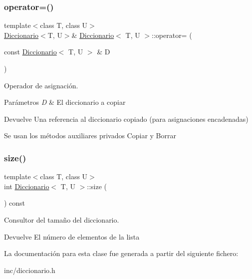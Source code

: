 \subsubsection{\texorpdfstring{operator=()}{operator=()}}
{\footnotesize\ttfamily template$<$class T, class U$>$ \\
\hyperlink{classDiccionario}{Diccionario}$<$T, U$>$\& \hyperlink{classDiccionario}{Diccionario}$<$ T, U $>$\+::operator= (\begin{DoxyParamCaption}\item[{const \hyperlink{classDiccionario}{Diccionario}$<$ T, U $>$ \&}]{D }\end{DoxyParamCaption})\hspace{0.3cm}{\ttfamily [inline]}}



Operador de asignación. 


\begin{DoxyParams}{Parámetros}
{\em D} & El diccionario a copiar \\
\hline
\end{DoxyParams}
\begin{DoxyReturn}{Devuelve}
Una referencia al diccionario copiado (para asignaciones encadenadas)
\end{DoxyReturn}
Se usan los métodos auxiliares privados Copiar y Borrar \mbox{\label{classDiccionario_aa576b001759429fd58210ca57257d6f8}} 
\subsubsection{\texorpdfstring{size()}{size()}}
{\footnotesize\ttfamily template$<$class T, class U$>$ \\
int \hyperlink{classDiccionario}{Diccionario}$<$ T, U $>$\+::size (\begin{DoxyParamCaption}{ }\end{DoxyParamCaption}) const\hspace{0.3cm}{\ttfamily [inline]}}



Consultor del tamaño del diccionario. 

\begin{DoxyReturn}{Devuelve}
El número de elementos de la lista 
\end{DoxyReturn}


La documentación para esta clase fue generada a partir del siguiente fichero\+:\begin{DoxyCompactItemize}
\item 
inc/diccionario.\+h\end{DoxyCompactItemize}

